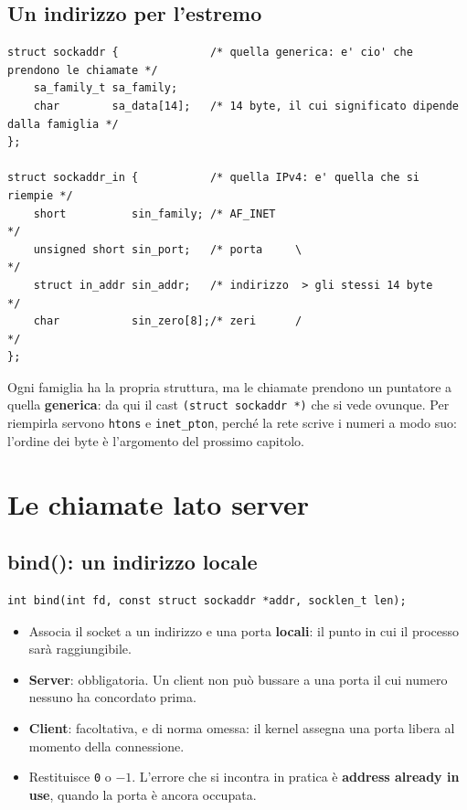 \subsection{Un indirizzo per l'estremo}

\begin{lstlisting}[language={[POSIX]C}]
struct sockaddr {              /* quella generica: e' cio' che prendono le chiamate */
    sa_family_t sa_family;
    char        sa_data[14];   /* 14 byte, il cui significato dipende dalla famiglia */
};

struct sockaddr_in {           /* quella IPv4: e' quella che si riempie */
    short          sin_family; /* AF_INET                              */
    unsigned short sin_port;   /* porta     \                          */
    struct in_addr sin_addr;   /* indirizzo  > gli stessi 14 byte      */
    char           sin_zero[8];/* zeri      /                          */
};
\end{lstlisting}

Ogni famiglia ha la propria struttura, ma le chiamate prendono un puntatore a quella \textbf{generica}: da qui il cast
\texttt{(struct sockaddr *)} che si vede ovunque. Per riempirla servono \texttt{htons} e \texttt{inet\_pton}, perché la
rete scrive i numeri a modo suo: l'ordine dei byte è l'argomento del prossimo capitolo.

\section{Le chiamate lato server}

\subsection{bind(): un indirizzo locale}

\begin{lstlisting}[language={[POSIX]C}]
int bind(int fd, const struct sockaddr *addr, socklen_t len);
\end{lstlisting}

\begin{itemize}
    \item Associa il socket a un indirizzo e una porta \textbf{locali}: il punto in cui il processo sarà raggiungibile.
    \item \textbf{Server}: obbligatoria. Un client non può bussare a una porta il cui numero nessuno ha concordato prima.
    \item \textbf{Client}: facoltativa, e di norma omessa: il kernel assegna una porta libera al momento della connessione.
    \item Restituisce \texttt{0} o $-1$. L'errore che si incontra in pratica è \textbf{address already in use}, quando la
          porta è ancora occupata.
\end{itemize}

